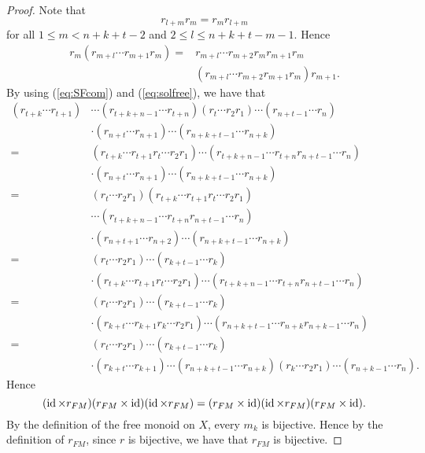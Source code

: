 \begin{proof}
Note that 
\begin{equation}\label{eq:SFcom}
r_{l+m}r_{m}=r_mr_{l+m}
\end{equation}
for all $1\leq m<n+k+t-2$ and $2\leq l\leq n+k+t-m-1$. Hence
\begin{align}\label{eq:solfree}
r_m(r_{m+l}\cdots r_{m+1}r_m)=&r_{m+l}\cdots r_{m+2}r_mr_{m+1}r_m\nonumber\\
&(r_{m+l}\cdots r_{m+2}r_{m+1}r_{m})r_{m+1}.
\end{align}
By using (\ref{eq:SFcom}) and (\ref{eq:solfree}), we have that
\begin{align*}
    (r_{t+k}\cdots r_{t+1})&\cdots (r_{t+k+n-1}\cdots r_{t+n})(r_{t}\cdots r_2r_{1})\cdots (r_{n+t-1}\cdots r_{n})\\
    &\cdot (r_{n+t}\cdots r_{n+1})\cdots (r_{n+k+t-1}\cdots r_{n+k})\\
    =&(r_{t+k}\cdots r_{t+1}r_t\cdots r_2r_1)\cdots (r_{t+k+n-1}\cdots r_{t+n}r_{n+t-1}\cdots r_{n})\\
    &\cdot (r_{n+t}\cdots r_{n+1})\cdots (r_{n+k+t-1}\cdots r_{n+k})\\
     =&(r_t\cdots r_2r_1)(r_{t+k}\cdots r_{t+1}r_t\cdots r_2r_1)\\
     &\cdots (r_{t+k+n-1}\cdots r_{t+n}r_{n+t-1}\cdots r_{n})\\
    &\cdot (r_{n+t+1}\cdots r_{n+2})\cdots (r_{n+k+t-1}\cdots r_{n+k})\\
    =&(r_t\cdots r_2r_1)\cdots (r_{k+t-1}\cdots r_{k})\\
    &\cdot (r_{t+k}\cdots r_{t+1}r_t\cdots r_2r_1)\cdots (r_{t+k+n-1}\cdots r_{t+n}r_{n+t-1}\cdots r_{n})\\
    =&(r_t\cdots r_2r_1)\cdots (r_{k+t-1}\cdots r_{k})\\
    &\cdot (r_{k+t}\cdots r_{k+1}r_k\cdots r_2r_1)\cdots (r_{n+k+t-1}\cdots r_{n+k}r_{n+k-1}\cdots r_{n})\\
    =&(r_t\cdots r_2r_1)\cdots (r_{k+t-1}\cdots r_{k})\\
    &\cdot (r_{k+t}\cdots r_{k+1})\cdots (r_{n+k+t-1}\cdots r_{n+k})(r_k\cdots r_2r_1)\cdots (r_{n+k-1}\cdots r_{n}).
\end{align*}
Hence
\[(\operatorname{id}\times r_{FM})(r_{FM}\times \operatorname{id})(\operatorname{id}\times r_{FM})=(r_{FM}\times \operatorname{id})(\operatorname{id}\times r_{FM})(r_{FM}\times \operatorname{id}).\]
By the definition of the free monoid on $X$, every $m_k$ is bijective. Hence by the definition of $r_{FM}$, since $r$ is bijective, we have that $r_{FM}$ is bijective.


\end{proof}

